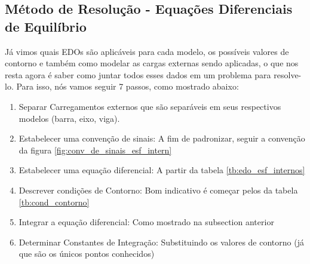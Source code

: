 \documentclass{article}
\begin{document}
        \subsection{Método de Resolução - Equações Diferenciais de Equilíbrio}
            Já vimos quais EDOs são aplicáveis para cada modelo, os possíveis valores de contorno e também como modelar as cargas externas sendo aplicadas, o que nos resta agora é saber como
            juntar todos esses dados em um problema para resolve-lo. Para isso, nós vamos seguir 7 passos, como mostrado abaixo:
            \begin{enumerate}\addtocounter{enumi}{-1}%
                \item Separar Carregamentos externos que são separáveis em seus respectivos modelos (barra, eixo, viga).
                \item Estabelecer uma convenção de sinais: A fim de padronizar, seguir a convenção da figura \ref{fig:conv_de_sinais_esf_intern}
                \item Estabelecer uma equação diferencial: A partir da tabela \ref{tb:edo_esf_internos}
                \item Descrever condições de Contorno: Bom indicativo é começar pelos da tabela \ref{tb:cond_contorno}
                \item Integrar a equação diferencial: Como mostrado na subsection anterior
                \item Determinar Constantes de Integração: Substituindo os valores de contorno (já que são os únicos pontos conhecidos)
            \end{enumerate}
\end{document}
